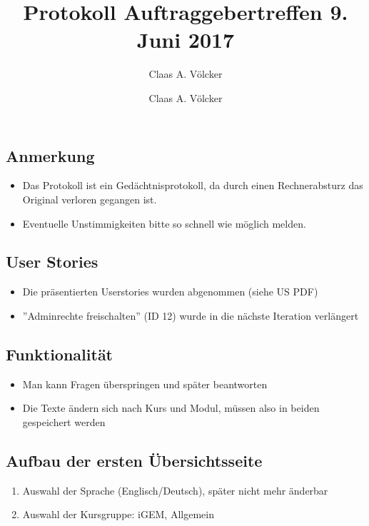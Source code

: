 \documentclass[colorback, accentcolor=tud1c, paper=a4]{tudexercise}
\title{Protokoll Auftraggebertreffen 9. Juni 2017}
\subtitle{Claas A. Völcker}
\author{Claas A. Völcker}
\begin{document}
	
	\maketitle
	
	\begin{multicols}{2}
		\subsection*{Anmerkung}
		\begin{itemize}
			\item Das Protokoll ist ein Gedächtnisprotokoll, da durch einen Rechnerabsturz das Original verloren gegangen ist.
			\item Eventuelle Unstimmigkeiten bitte so schnell wie möglich melden.
		\end{itemize}
		
		\subsection*{User Stories}
		\begin{itemize}
			\item Die präsentierten Userstories wurden abgenommen (siehe US PDF)
			\item ''Adminrechte freischalten'' (ID 12) wurde in die nächste Iteration verlängert
		\end{itemize}
		
		\subsection*{Funktionalität}
		\begin{itemize}
			\item Man kann Fragen überspringen und später beantworten
			\item Die Texte ändern sich nach Kurs und Modul, müssen also in beiden gespeichert werden
		\end{itemize}
		
		\subsection*{Aufbau der ersten Übersichtsseite}
		\begin{enumerate}
			\item Auswahl der Sprache (Englisch/Deutsch), später nicht mehr änderbar
			\item Auswahl der Kursgruppe: iGEM, Allgemein
		\end{enumerate}
		

\end{multicols}
\end{document}
